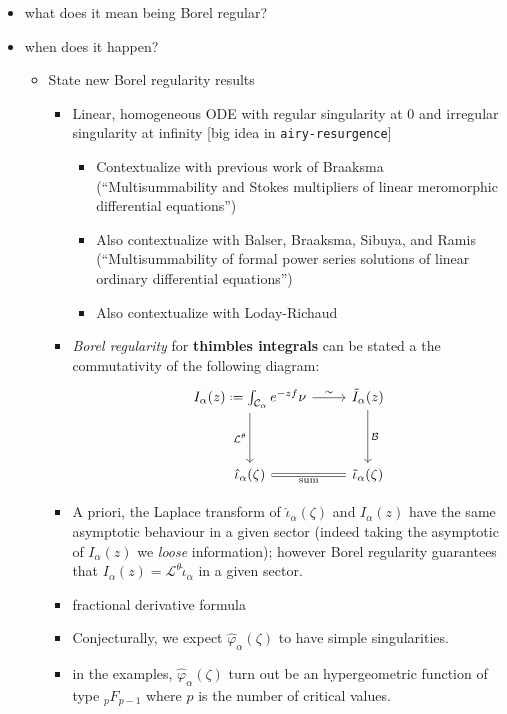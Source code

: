 \documentclass{article}
\newcommand*{\defeq}{\mathrel{\vcenter{\baselineskip0.5ex \lineskiplimit0pt
                     \hbox{\scriptsize.}\hbox{\scriptsize.}}}%
                     =}
\begin{document}
\color{orange}
\begin{itemize}
\item what does it mean being Borel regular?
\item when does it happen?
\begin{itemize}
\item State new Borel regularity results
\begin{itemize}
\item Linear, homogeneous ODE with regular singularity at 0 and irregular singularity at infinity [big idea in {\tt airy-resurgence}]
\begin{itemize}
\item Contextualize with previous work of Braaksma (``Multisummability and Stokes multipliers of linear meromorphic differential equations'')
\item Also contextualize with Balser, Braaksma, Sibuya, and Ramis (``Multisummability of formal power series solutions of linear ordinary differential equations'')
\item Also contextualize with Loday-Richaud
\end{itemize}
\item \emph{Borel regularity} for \textbf{thimbles integrals} can be stated a the commutativity of the following diagram:
\begin{equation}
\begin{tikzcd}
I_{\alpha}(z)\defeq\int_{\mathcal{C}_\alpha}e^{-zf}\nu \arrow[r,"\sim"]\arrow[dd, swap, "\mathcal{L}^\theta "] & \tilde{I}_{\alpha}(z)\arrow[dd,"\mathcal{B}"]\\
& \\
\hat{\iota}_\alpha(\zeta)\arrow[r,equal,swap, "\text{sum}"] & \tilde{\iota}_{\alpha}(\zeta) 
\end{tikzcd}
\end{equation}
\item A priori, the Laplace transform of $\hat{\iota}_\alpha(\zeta)$ and $I_{\alpha}(z)$ have the same asymptotic behaviour in a given sector (indeed taking the asymptotic of $I_\alpha(z)$ we \textit{loose} information); however Borel regularity guarantees that $I_{\alpha}(z)=\mathcal{L}^{\theta}\hat{\iota}_{\alpha}$ in a given sector.
\item fractional derivative formula
\item Conjecturally, we expect $\hat{\varphi}_\alpha(\zeta)$ to have simple singularities. 
\item in the examples, $\hat{\varphi}_\alpha(\zeta)$ turn out be an hypergeometric function of type ${}_pF_{p-1}$ where $p$ is the number of critical values. 

\end{itemize}
\end{itemize}
\end{itemize}
\end{document}

